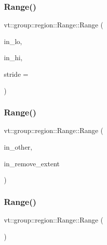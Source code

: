 \subsubsection{\texorpdfstring{Range()}{Range()}\hspace{0.1cm}{\footnotesize\ttfamily [1/4]}}
{\footnotesize\ttfamily vt\+::group\+::region\+::\+Range\+::\+Range (\begin{DoxyParamCaption}\item[{\hyperlink{structvt_1_1group_1_1region_1_1_region_abf426ff85bed72c1c6524fad6a9f1751}{Bound\+Type} const \&}]{in\+\_\+lo,  }\item[{\hyperlink{structvt_1_1group_1_1region_1_1_region_abf426ff85bed72c1c6524fad6a9f1751}{Bound\+Type} const \&}]{in\+\_\+hi,  }\item[{\hyperlink{structvt_1_1group_1_1region_1_1_region_abf426ff85bed72c1c6524fad6a9f1751}{Bound\+Type} const \&}]{stride = {} }\end{DoxyParamCaption})}

\mbox{\label{structvt_1_1group_1_1region_1_1_range_a9cd7425570ad25a2d5faf70b5f233bbd}} 
\subsubsection{\texorpdfstring{Range()}{Range()}\hspace{0.1cm}{\footnotesize\ttfamily [2/4]}}
{\footnotesize\ttfamily vt\+::group\+::region\+::\+Range\+::\+Range (\begin{DoxyParamCaption}\item[{\hyperlink{structvt_1_1group_1_1region_1_1_range}{Range} const \&}]{in\+\_\+other,  }\item[{\hyperlink{structvt_1_1group_1_1region_1_1_region_abf426ff85bed72c1c6524fad6a9f1751}{Bound\+Type}}]{in\+\_\+remove\+\_\+extent }\end{DoxyParamCaption})}

\mbox{\label{structvt_1_1group_1_1region_1_1_range_aaf4f48ee287bd842d3a0c1260737bcb1}} 
\subsubsection{\texorpdfstring{Range()}{Range()}\hspace{0.1cm}{\footnotesize\ttfamily [3/4]}}
{\footnotesize\ttfamily vt\+::group\+::region\+::\+Range\+::\+Range (\begin{DoxyParamCaption}\item[{\hyperlink{structvt_1_1group_1_1region_1_1_range}{Range} const \&}]{ }\end{DoxyParamCaption})\hspace{0.3cm}{\ttfamily [default]}}


